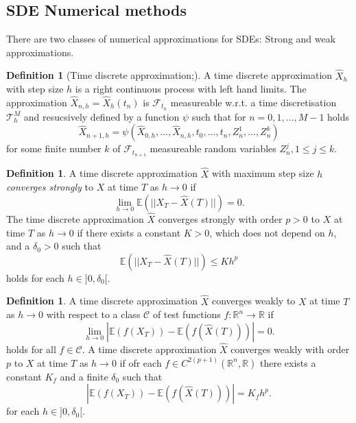 \documentclass[12pt]{article}
\theoremstyle{definition}
\newtheorem{definition}[theorem]{Definition}
\numberwithin{equation}{section}
\begin{document}
\subsection{SDE Numerical methods}
\label{subsec:SdeNumericalMethods}
There are two classes of numerical approximations for SDEs: Strong and weak approximations. 
\begin{definition}[Time discrete approximation;]
  A time discrete approximation $\widehat{X}_h$ with step size $h$ is a right continuous process with left hand limits. The approximation $\widehat{X}_{n,h} = \widehat{X}_h(t_n)$ is $\mathcal{F}_{t_n}$ measureable w.r.t. a time discretisation $\mathcal{T}^M_h$ and resucsively defined by a function $\psi$ such that for $n=0,1,\dots,M-1$ holds
  \begin{equation}
    \widehat{X}_{n+1, h} = \psi(\widehat{X}_{0,h}, \dots, \widehat{X}_{n,h}, t_0, \dots, t_n, Z^1_n,\dots, Z_n^k)
  \end{equation}
  for some finite number $k$ of $\mathcal{F}_{t_{n+1}}$ measureable random variables $Z^j_n, 1 \leq j \leq k$.
\end{definition}
\begin{definition}
  A time discrete approximation $\widehat{X}$ with maximum step size $h$ \emph{converges strongly} to $X$ at time $T$ as $h \rightarrow 0$ if 
  \begin{equation}
    \lim_{h \rightarrow 0} \mathbb{E}(||X_T - \widehat{X}(T)||) = 0.
  \end{equation}
  The time discrete approximation $\widehat{X}$ converges strongly with order $p>0$ to $X$ at time $T$ as $h \rightarrow 0$ if there exists a constant $K > 0$, which does not depend on $h$, and a $\delta_0 > 0$ such that 
  \begin{equation}
    \mathbb{E}(||X_T - \widehat{X}(T)||) \leq K h^p
  \end{equation}
  holds for each $h \in ]0, \delta_0[$.
\end{definition}

\begin{definition}
  A time discrete approximation $\widehat{X}$ converges weakly to $X$ at time $T$ as $h \rightarrow 0$ with respect to a class $\mathcal{C}$ of test functions $f: \mathbb{R}^n \rightarrow \mathbb{R}$ if 
  \begin{equation}
    \lim_{h \rightarrow 0} |\mathbb{E}(f(X_T)) - \mathbb{E}(f(\widehat{X}(T)))| = 0.
  \end{equation}
  holds for all $f \in \mathcal{C}$.
  A time discrete approximation $\widehat{X}$ converges weakly with order $p$ to $X$ at time $T$ as $h \rightarrow 0$ if ofr each $f \in C^{2(p+1)}(\mathbb{R}^n, \mathbb{R})$ there exists a constant $K_f$ and a finite $\delta_0$ such that 
  \begin{equation}
     |\mathbb{E}(f(X_T)) - \mathbb{E}(f(\widehat{X}(T)))| = K_f h^p.
  \end{equation}
  for each $h \in ]0, \delta_0[$.
\end{definition}
\end{document}
